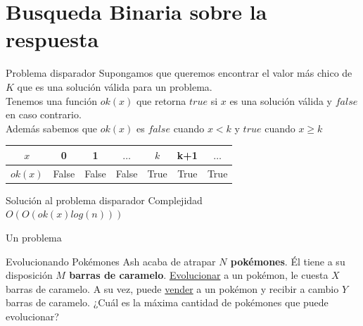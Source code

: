 \documentclass{beamer}
\begin{document}
\section{Busqueda Binaria sobre la respuesta}  
\begin{frame}{Problema disparador}
    Supongamos que queremos encontrar el valor más chico de $K$ que es una solución válida para un problema.\\
    Tenemos una función $ok(x)$ que retorna $true$ si $x$ es una solución válida y $false$ en caso contrario.\\
    Además sabemos que $ok(x)$ es $false$ cuando $x < k$ y $true$ cuando $x \ge k$ 

    {\footnotesize
    \begin{center}
    \begin{tabular}{|c|| c | c | c || c | c | c |} 
    \hline
    $x$    & 0 & 1 & $\dots$ & $k$ & k+1 & $\dots$ \\
    \hline\hline
    $ok(x)$ & \textcolor{Mahogany}{False} & \textcolor{Mahogany}{False} & \textcolor{Mahogany}{False}  & \textcolor{OliveGreen}{True} & \textcolor{OliveGreen}{True} & \textcolor{OliveGreen}{True}  \\ 
    \hline
    \end{tabular}
    \end{center}
    }
\end{frame}
\begin{frame}{Solución al problema disparador}
    \busquedaBinariaDisp
    \centering
    Complejidad\\
    \pause
    $O(O(ok(x) log(n)))$
    
\end{frame}
\begin{frame}{Un problema}
	\begin{block}{Evolucionando Pokémones}
	Ash acaba de atrapar \textbf{$N$ pokémones}. Él tiene a su disposición \textbf{$M$ barras de caramelo}. \underline{Evolucionar} a un pokémon, le cuesta \underline{$X$} barras de caramelo. A su vez, puede \underline{vender} a un pokémon y recibir a cambio \underline{$Y$} barras de caramelo. ¿Cuál es la máxima cantidad de pokémones que puede evolucionar? 
	\end{block}
	\vspace{150pt}	
\end{frame}
\end{document}
